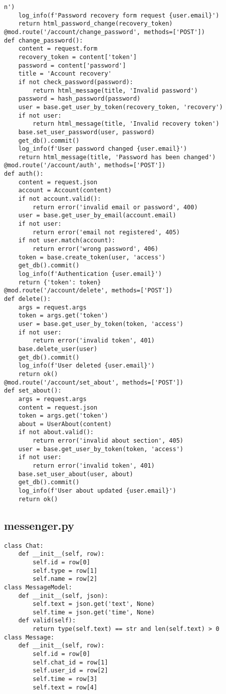 \documentclass[listing]{espd}
\begin{document}
\begin{verbatim}
n')
    log_info(f'Password recovery form request {user.email}')
    return html_password_change(recovery_token)
@mod.route('/account/change_password', methods=['POST'])
def change_password():
    content = request.form
    recovery_token = content['token']
    password = content['password']
    title = 'Account recovery'
    if not check_password(password):
        return html_message(title, 'Invalid password')
    password = hash_password(password)
    user = base.get_user_by_token(recovery_token, 'recovery')
    if not user:
        return html_message(title, 'Invalid recovery token')
    base.set_user_password(user, password)
    get_db().commit()
    log_info(f'User password changed {user.email}')
    return html_message(title, 'Password has been changed')
@mod.route('/account/auth', methods=['POST'])
def auth():
    content = request.json
    account = Account(content)
    if not account.valid():
        return error('invalid email or password', 400)
    user = base.get_user_by_email(account.email)
    if not user:
        return error('email not registered', 405)
    if not user.match(account):
        return error('wrong password', 406)
    token = base.create_token(user, 'access')
    get_db().commit()
    log_info(f'Authentication {user.email}')
    return {'token': token}
@mod.route('/account/delete', methods=['POST'])
def delete():
    args = request.args
    token = args.get('token')
    user = base.get_user_by_token(token, 'access')
    if not user:
        return error('invalid token', 401)
    base.delete_user(user)
    get_db().commit()
    log_info(f'User deleted {user.email}')
    return ok()
@mod.route('/account/set_about', methods=['POST'])
def set_about():
    args = request.args
    content = request.json
    token = args.get('token')
    about = UserAbout(content)
    if not about.valid():
        return error('invalid about section', 405)
    user = base.get_user_by_token(token, 'access')
    if not user:
        return error('invalid token', 401)
    base.set_user_about(user, about)
    get_db().commit()
    log_info(f'User about updated {user.email}')
    return ok()
\end{verbatim}

\subsection{messenger.py}
\begin{verbatim}
class Chat:
    def __init__(self, row):
        self.id = row[0]
        self.type = row[1]
        self.name = row[2]
class MessageModel:
    def __init__(self, json):
        self.text = json.get('text', None)
        self.time = json.get('time', None)
    def valid(self):
        return type(self.text) == str and len(self.text) > 0
class Message:
    def __init__(self, row):
        self.id = row[0]
        self.chat_id = row[1]
        self.user_id = row[2]
        self.time = row[3]
        self.text = row[4]
\end{verbatim}
\end{document}
